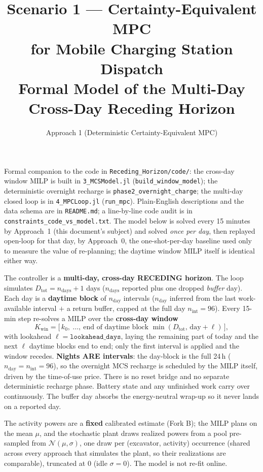 \documentclass[11pt]{article}
\title{Scenario 1 --- Certainty-Equivalent MPC\\
       for Mobile Charging Station Dispatch\\[2pt]
       \large Formal Model of the Multi-Day Cross-Day Receding Horizon}
\author{Approach 1 (Deterministic Certainty-Equivalent MPC)}
\date{}
\begin{document}
\maketitle

Formal companion to the code in \texttt{Receding\_Horizon/code/}: the cross-day
window MILP is built in \texttt{3\_MCSModel.jl} (\texttt{build\_window\_model}); the
deterministic overnight recharge is \texttt{phase2\_overnight\_charge}; the multi-day
closed loop is in \texttt{4\_MPCLoop.jl} (\texttt{run\_mpc}). Plain-English descriptions
and the data schema are in \texttt{README.md}; a line-by-line code audit is in
\texttt{constraints\_code\_vs\_model.txt}. The model below is solved every 15 minutes by
Approach~1 (this document's subject) and solved \emph{once per day}, then replayed
open-loop for that day, by Approach~0, the one-shot-per-day baseline used only to
measure the value of re-planning; the daytime window MILP itself is identical either
way.

The controller is a \textbf{multi-day, cross-day RECEDING horizon}. The loop simulates
$D_{\text{tot}} = n_{\text{days}}+1$ days ($n_{\text{days}}$ reported plus one dropped
\emph{buffer} day). Each day is a \textbf{daytime block} of $n_{\text{day}}$ intervals
($n_{\text{day}}$ inferred from the last work-available interval $+$ a return buffer,
capped at the full day $n_{\text{int}}=96$). Every 15-min step re-solves a MILP over the
\textbf{cross-day window}
\[
  K_{\text{win}} = \bigl[\,k_0,\ \dots,\ \text{end of daytime block }
  \min(D_{\text{tot}},\,\text{day}+\ell)\,\bigr],
\]
with lookahead $\ell = \texttt{lookahead\_days}$, laying the remaining part of today and
the next $\ell$ daytime blocks end to end; only the first interval is applied and the
window recedes. \textbf{Nights ARE intervals}: the day-block is the full 24\,h
($n_{\text{day}}=n_{\text{int}}=96$), so the overnight MCS recharge is scheduled by the MILP
itself, driven by the time-of-use price. There is no reset bridge and no separate deterministic
recharge phase. Battery state and any unfinished work carry over continuously. The buffer day
absorbs the energy-neutral wrap-up so it never lands on a reported day.

The activity powers are a \textbf{fixed} calibrated estimate (Fork B); the MILP plans on
the mean $\mu$, and the stochastic plant draws realized powers from a pool pre-sampled from
$\mathcal{N}(\mu,\sigma)$, one draw per (excavator, activity) occurrence (shared across every
approach that simulates the plant, so their realizations are comparable), truncated at $0$
(idle $\sigma=0$). The model is not re-fit online.
\end{document}
